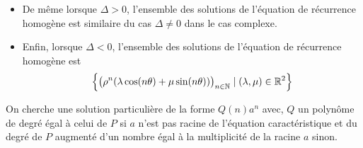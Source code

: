 \documentclass{article}
\begin{document}
\begin{question_kholle}
\begin{itemize}
\begin{itemize}
\begin{itemize}
                          l’équation de récurrence homogène est similaire à celui
                          du cas complexe.
                    \item De même lorsque $\Delta>0$, l’ensemble des
                          solutions de l’équation de récurrence homogène est
                          similaire du cas $\Delta\neq 0$ dans le cas complexe.
                    \item Enfin, lorsque $\Delta<0$, l’ensemble des solutions
                          de l’équation de récurrence homogène est
                          \[
                            \Bigl\{\bigl(\rho^{n}(\lambda\cos(n \theta)+\mu\sin(n
                            \theta))\bigr)_{n\in\mathbb N} \mid (\lambda, \mu)\in\mathbb R^{2}\Bigr\}
                          \]
                  \end{itemize}
          \end{itemize}
          On cherche une solution particulière de la forme $Q(n)a^{n}$
          avec, $Q$ un polynôme de degré égal à celui de $P$ si $a$ n’est
          pas racine de l’équation caractéristique et du degré de $P$
          augmenté d’un nombre égal à la multiplicité de la racine $a$ sinon.
  \end{itemize}

\end{question_kholle}
\end{document}
